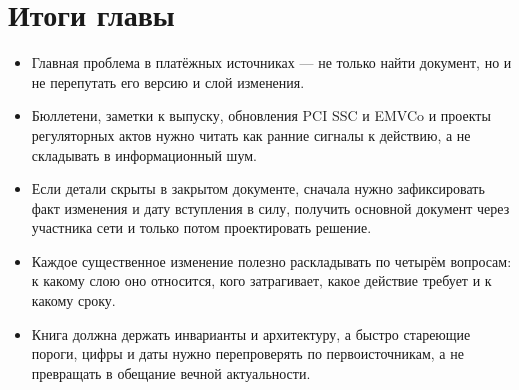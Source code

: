 \section*{Итоги главы}
\begin{itemize}
  \item Главная проблема в платёжных источниках — не только найти
        документ, но и не перепутать его версию и слой изменения.
  \item Бюллетени, заметки к выпуску, обновления PCI SSC и EMVCo
        и проекты регуляторных актов нужно читать как ранние
        сигналы к действию, а не складывать в информационный шум.
  \item Если детали скрыты в закрытом документе, сначала нужно
        зафиксировать факт изменения и дату вступления в силу,
        получить основной документ через участника сети и только
        потом проектировать решение.
  \item Каждое существенное изменение полезно раскладывать по четырём
        вопросам: к какому слою оно относится, кого затрагивает,
        какое действие требует и к какому сроку.
  \item Книга должна держать инварианты и архитектуру, а быстро
        стареющие пороги, цифры и даты нужно перепроверять
        по первоисточникам, а не превращать в обещание вечной
        актуальности.
\end{itemize}

